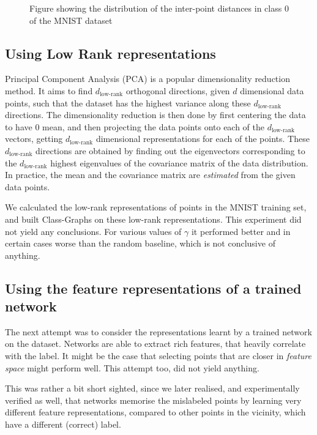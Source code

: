 \documentclass{ociamthesis}
\begin{document}
\begin{figure}
    \caption{Figure showing the distribution of the inter-point distances in
    class 0 of the MNIST dataset}
    \label{fig:inter-point-distances}
\end{figure}

\subsection{Using Low Rank representations}
Principal Component Analysis (PCA) is a popular dimensionality reduction method.
It aims to find $d_\text{low-rank}$ orthogonal directions, given $d$ dimensional
data points, such that the dataset has the highest variance along these
$d_\text{low-rank}$ directions. The dimensionality reduction is then done by
first centering the data to have $0$ mean, and then projecting the data points
onto each of the $d_\text{low-rank}$ vectors, getting $d_\text{low-rank}$
dimensional representations for each of the points. These $d_\text{low-rank}$
directions are obtained by finding out the eigenvectors corresponding to the
$d_\text{low-rank}$ highest eigenvalues of the covariance matrix of the data
distribution. In practice, the mean and the covariance matrix are
\emph{estimated} from the given data points.

We calculated the low-rank representations of points in the MNIST training set,
and built Class-Graphs on these low-rank representations. This experiment did
not yield any conclusions. For various values of $\gamma$ it performed better
and in certain cases worse than the random baseline, which is not conclusive of
anything.

\subsection{Using the feature representations of a trained network}
The next attempt was to consider the representations learnt by a trained network
on the dataset. Networks are able to extract rich features, that heavily
correlate with the label. It might be the case that selecting points that are
closer in \emph{feature space} might perform well. This attempt too, did not
yield anything.

This was rather a bit short sighted, since we later realised, and experimentally
verified as well, that networks memorise the mislabeled points by learning very
different feature representations, compared to other points in the vicinity,
which have a different (correct) label.
\end{document}
